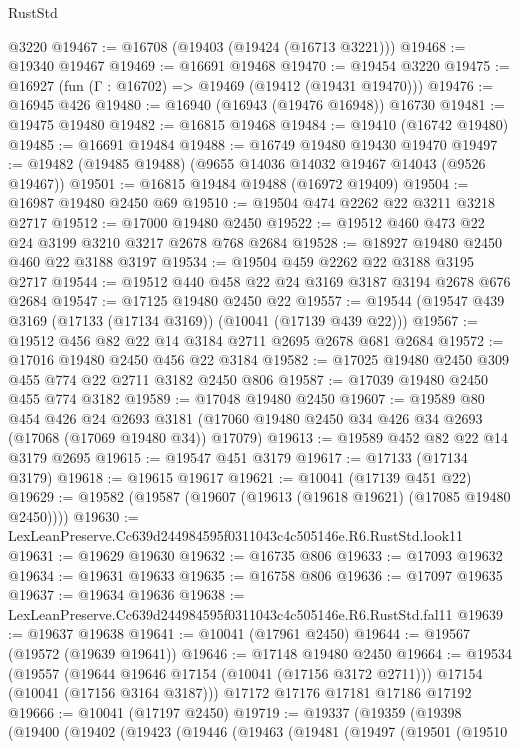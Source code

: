 \begin{lexlean}{RustStd}
\begin{coremodule}
    @3220
@19467 := @16708 (@19403 (@19424 (@16713 @3221)))
@19468 := @19340 @19467
@19469 := @16691 @19468
@19470 := @19454 @3220
@19475 := @16927 (fun (Γ : @16702) => @19469 (@19412 (@19431 @19470)))
@19476 := @16945 @426
@19480 := @16940 (@16943 (@19476 @16948)) @16730
@19481 := @19475 @19480
@19482 := @16815 @19468
@19484 := @19410 (@16742 @19480)
@19485 := @16691 @19484
@19488 := @16749 @19480 @19430 @19470
@19497 := @19482 (@19485 @19488) (@9655 @14036 @14032 @19467 @14043 (@9526 @19467))
@19501 := @16815 @19484 @19488 (@16972 @19409)
@19504 := @16987 @19480 @2450 @69
@19510 := @19504 @474 @2262 @22 @3211 @3218 @2717
@19512 := @17000 @19480 @2450
@19522 := @19512 @460 @473 @22 @24 @3199 @3210 @3217 @2678 @768 @2684
@19528 := @18927 @19480 @2450 @460 @22 @3188 @3197
@19534 := @19504 @459 @2262 @22 @3188 @3195 @2717
@19544 := @19512 @440 @458 @22 @24 @3169 @3187 @3194 @2678 @676 @2684
@19547 := @17125 @19480 @2450 @22
@19557 := @19544 (@19547 @439 @3169 (@17133 (@17134 @3169)) (@10041 (@17139 @439 @22)))
@19567 := @19512 @456 @82 @22 @14 @3184 @2711 @2695 @2678 @681 @2684
@19572 := @17016 @19480 @2450 @456 @22 @3184
@19582 := @17025 @19480 @2450 @309 @455 @774 @22 @2711 @3182 @2450 @806
@19587 := @17039 @19480 @2450 @455 @774 @3182
@19589 := @17048 @19480 @2450
@19607 := @19589
    @80
    @454
    @426
    @24
    @2693
    @3181
    (@17060 @19480 @2450 @34 @426 @34 @2693 (@17068 (@17069 @19480 @34)) @17079)
@19613 := @19589 @452 @82 @22 @14 @3179 @2695
@19615 := @19547 @451 @3179
@19617 := @17133 (@17134 @3179)
@19618 := @19615 @19617
@19621 := @10041 (@17139 @451 @22)
@19629 := @19582 (@19587 (@19607 (@19613 (@19618 @19621) (@17085 @19480 @2450))))
@19630 := LexLeanPreserve.Cc639d244984595f0311043c4c505146e.R6.RustStd.look11
@19631 := @19629 @19630
@19632 := @16735 @806
@19633 := @17093 @19632
@19634 := @19631 @19633
@19635 := @16758 @806
@19636 := @17097 @19635
@19637 := @19634 @19636
@19638 := LexLeanPreserve.Cc639d244984595f0311043c4c505146e.R6.RustStd.fal11
@19639 := @19637 @19638
@19641 := @10041 (@17961 @2450)
@19644 := @19567 (@19572 (@19639 @19641))
@19646 := @17148 @19480 @2450
@19664 := @19534
    (@19557
      (@19644 @19646 @17154 (@10041 (@17156 @3172 @2711)))
      @17154
      (@10041 (@17156 @3164 @3187)))
    @17172
    @17176
    @17181
    @17186
    @17192
@19666 := @10041 (@17197 @2450)
@19719 := @19337
    (@19359
      (@19398
        (@19400
          (@19402
            (@19423
              (@19446
                (@19463
                  (@19481
                    (@19497
                      (@19501
                        (@19510

\end{coremodule}
\end{lexlean}
